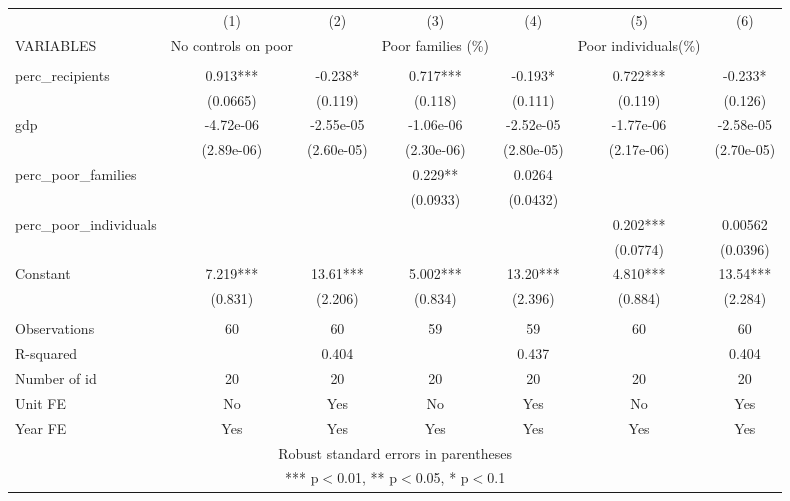 \documentclass[]{article}
\begin{document}
\begin{tabular}{lcccccc} \hline
 & (1) & (2) & (3) & (4) & (5) & (6) \\
VARIABLES & No controls on poor &  & Poor families (\%) &  & Poor individuals(\%) &  \\ \hline
 &  &  &  &  &  &  \\
perc\_recipients & 0.913*** & -0.238* & 0.717*** & -0.193* & 0.722*** & -0.233* \\
 & (0.0665) & (0.119) & (0.118) & (0.111) & (0.119) & (0.126) \\
gdp & -4.72e-06 & -2.55e-05 & -1.06e-06 & -2.52e-05 & -1.77e-06 & -2.58e-05 \\
 & (2.89e-06) & (2.60e-05) & (2.30e-06) & (2.80e-05) & (2.17e-06) & (2.70e-05) \\
perc\_poor\_families &  &  & 0.229** & 0.0264 &  &  \\
 &  &  & (0.0933) & (0.0432) &  &  \\
perc\_poor\_individuals &  &  &  &  & 0.202*** & 0.00562 \\
 &  &  &  &  & (0.0774) & (0.0396) \\
Constant & 7.219*** & 13.61*** & 5.002*** & 13.20*** & 4.810*** & 13.54*** \\
 & (0.831) & (2.206) & (0.834) & (2.396) & (0.884) & (2.284) \\
 &  &  &  &  &  &  \\
Observations & 60 & 60 & 59 & 59 & 60 & 60 \\
R-squared &  & 0.404 &  & 0.437 &  & 0.404 \\
Number of id & 20 & 20 & 20 & 20 & 20 & 20 \\
Unit FE & No & Yes & No & Yes & No & Yes \\
 Year FE & Yes & Yes & Yes & Yes & Yes & Yes \\ \hline
\multicolumn{7}{c}{ Robust standard errors in parentheses} \\
\multicolumn{7}{c}{ *** p$<$0.01, ** p$<$0.05, * p$<$0.1} \\
\end{tabular}
\end{document}
